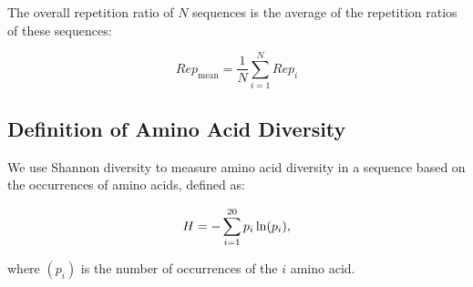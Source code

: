 \documentclass{article}
\begin{document}
The overall repetition ratio of $N$ sequences is the average of the repetition ratios of these sequences:

\begin{equation}
Rep_{\text{mean}} = \frac{1}{N} \sum_{i=1}^{N} Rep_i
\end{equation}

\subsection*{Definition of Amino Acid Diversity}
We use Shannon diversity to measure amino acid diversity in a sequence based on the occurrences of amino acids, defined as:

\begin{equation}
\label{eq:shannon}
H = -\sum_{i=1}^{20} p_i \ln(p_i)\space,
\end{equation}

\noindent where $(p_i)$ is the number of occurrences of the $i$ amino acid.






\end{document}
